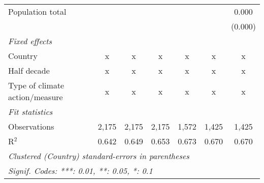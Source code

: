 \begin{tabular}{lcccccc}
   Population total                                     &              &                &                &                &                & 0.000\\   
                                                        &              &                &                &                &                & (0.000)\\   
   \emph{Fixed effects}\\
   Country                                              & x            & x              & x              & x              & x              & x\\  
   Half decade                                          & x            & x              & x              & x              & x              & x\\  
   Type of climate action/measure                       & x            & x              & x              & x              & x              & x\\  
   \midrule \emph{Fit statistics}\\
   Observations                                         & 2,175        & 2,175          & 2,175          & 1,572          & 1,425          & 1,425\\  
   R$^2$                                                & 0.642        & 0.649          & 0.653          & 0.673          & 0.670          & 0.670\\  
   \midrule
   \multicolumn{7}{l}{\emph{Clustered (Country) standard-errors in parentheses}}\\
   \multicolumn{7}{l}{\emph{Signif. Codes: ***: 0.01, **: 0.05, *: 0.1}}\\
\end{tabular}
\par\endgroup


